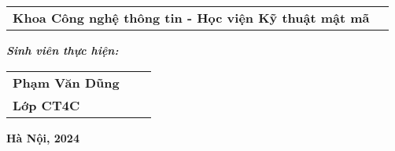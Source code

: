 \begin{titlepage}
\begin{flushleft}
\begin{tabular}{l c}
			\hspace{4cm}\textbf{Khoa Công nghệ thông tin - Học viện Kỹ thuật mật mã}
			
		\end{tabular}
		
		\vspace{0.6cm}
		
		\hspace{3cm}\textbf{\textit{Sinh viên thực hiện:}}
		
		\begin{tabular}{l c c}
			
			\hspace{4cm}\textbf{Phạm Văn Dũng} &  \\
			
			\hspace{4cm}\textbf{Lớp CT4C}
		\end{tabular}
		
	\end{flushleft}
	
	\begin{center}
		
		\vspace{1cm}
		
		\textbf{Hà Nội, 2024}
		
	\end{center}
\end{titlepage}
